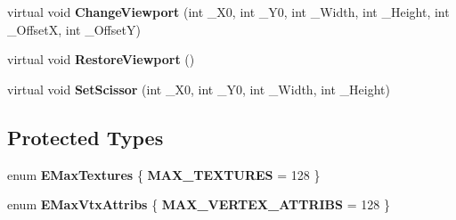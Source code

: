 \begin{DoxyCompactItemize}
\item 
\hypertarget{class_c_tw_graph_open_g_l_a0a059d5b64f2b44bc302452b88e877fa}{virtual void {\bfseries Change\+Viewport} (int \+\_\+\+X0, int \+\_\+\+Y0, int \+\_\+\+Width, int \+\_\+\+Height, int \+\_\+\+Offset\+X, int \+\_\+\+Offset\+Y)}\label{class_c_tw_graph_open_g_l_a0a059d5b64f2b44bc302452b88e877fa}

\item 
\hypertarget{class_c_tw_graph_open_g_l_a0ef9d4c81710675f72d874d7aa63f288}{virtual void {\bfseries Restore\+Viewport} ()}\label{class_c_tw_graph_open_g_l_a0ef9d4c81710675f72d874d7aa63f288}

\item 
\hypertarget{class_c_tw_graph_open_g_l_a22b71c0c4b5aca342aea1addd45b5c0d}{virtual void {\bfseries Set\+Scissor} (int \+\_\+\+X0, int \+\_\+\+Y0, int \+\_\+\+Width, int \+\_\+\+Height)}\label{class_c_tw_graph_open_g_l_a22b71c0c4b5aca342aea1addd45b5c0d}

\end{DoxyCompactItemize}
\subsection*{Protected Types}
\begin{DoxyCompactItemize}
\item 
\hypertarget{class_c_tw_graph_open_g_l_ac3ddad54178f9f9e0152d15fda41efce}{enum {\bfseries E\+Max\+Textures} \{ {\bfseries M\+A\+X\+\_\+\+T\+E\+X\+T\+U\+R\+E\+S} = 128
 \}}\label{class_c_tw_graph_open_g_l_ac3ddad54178f9f9e0152d15fda41efce}

\item 
\hypertarget{class_c_tw_graph_open_g_l_ad39d0e223d4f049094866bbec00673b7}{enum {\bfseries E\+Max\+Vtx\+Attribs} \{ {\bfseries M\+A\+X\+\_\+\+V\+E\+R\+T\+E\+X\+\_\+\+A\+T\+T\+R\+I\+B\+S} = 128
 \}}\label{class_c_tw_graph_open_g_l_ad39d0e223d4f049094866bbec00673b7}

\end{DoxyCompactItemize}
